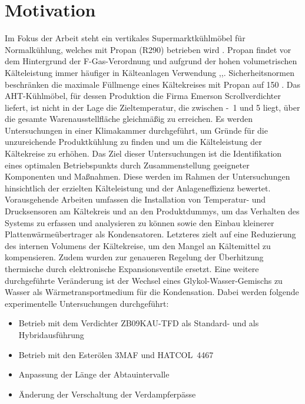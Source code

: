 
\chapter{Motivation}
\label{cha:Motivation}

Im Fokus der Arbeit steht ein vertikales Supermarktkühlmöbel für Normalkühlung, welches mit Propan (R290) betrieben wird \cite{DINDeutschesInstitutfurNormunge.V..b}. Propan findet vor dem Hintergrund der F-Gas-Verordnung und aufgrund der hohen volumetrischen Kälteleistung immer häufiger in Kälteanlagen Verwendung \cite{EUParlamentRat.2006},\cite{Huber.2016},\cite{Moons.2013}. Sicherheitsnormen beschränken die maximale Füllmenge eines Kältekreises mit Propan auf \unit{150}{\gram} \cite{DINDeutschesInstitutfurNormunge.V..2014b}. Das AHT-Kühlmöbel, für dessen Produktion die Firma Emerson Scrollverdichter liefert, ist nicht in der Lage die Zieltemperatur, die zwischen \unit{-1}{\celsius} und \unit{5}{\celsius} liegt, über die gesamte Warenausstellfläche gleichmäßig zu erreichen. Es werden Untersuchungen in einer Klimakammer durchgeführt, um Gründe für die unzureichende Produktkühlung zu finden und um die Kälteleistung der Kältekreise zu erhöhen. Das Ziel dieser Untersuchungen ist die Identifikation eines optimalen Betriebspunkts durch Zusammenstellung geeigneter Komponenten und Maßnahmen. Diese werden im Rahmen der Untersuchungen hinsichtlich der erzielten Kälteleistung und der Anlageneffizienz bewertet. 
Vorausgehende Arbeiten umfassen die Installation von Temperatur- und Drucksensoren am Kältekreis und an den Produktdummys, um das Verhalten des Systems zu erfassen und analysieren zu können sowie den Einbau kleinerer Plattenwärmeübertrager als Kondensatoren. Letzteres zielt auf eine Reduzierung des internen Volumens der Kältekreise, um den Mangel an Kältemittel zu kompensieren. Zudem wurden zur genaueren Regelung der Überhitzung thermische durch elektronische Expansionsventile ersetzt. Eine weitere durchgeführte Veränderung ist der Wechsel eines Glykol-Wasser-Gemischs zu Wasser als Wärmetransportmedium für die Kondensation.
Dabei werden folgende experimentelle Untersuchungen durchgeführt:

\begin{itemize} 
\item Betrieb mit dem Verdichter ZB09KAU-TFD als Standard- und als Hybridausführung
\item Betrieb mit den Esterölen 3MAF und HATCOL~4467
\item Anpassung der Länge der Abtauintervalle
\item Änderung der Verschaltung der Verdampferpässe
\end{itemize}

